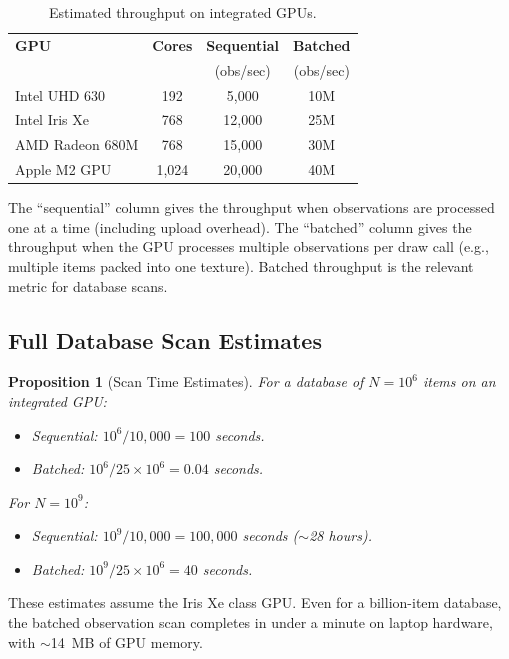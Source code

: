 \documentclass[11pt,twocolumn,a4paper]{article}
\newtheorem{proposition}[theorem]{Proposition}
\theoremstyle{definition}
\theoremstyle{remark}
\begin{document}
\begin{table}[H]
\centering
\caption{Estimated throughput on integrated GPUs.}
\label{tab:throughput}
\begin{tabular}{@{}lccc@{}}
\toprule
\textbf{GPU} & \textbf{Cores} & \textbf{Sequential} & \textbf{Batched} \\
 & & (obs/sec) & (obs/sec) \\
\midrule
Intel UHD 630 & 192 & 5{,}000 & 10M \\
Intel Iris Xe & 768 & 12{,}000 & 25M \\
AMD Radeon 680M & 768 & 15{,}000 & 30M \\
Apple M2 GPU & 1{,}024 & 20{,}000 & 40M \\
\bottomrule
\end{tabular}
\end{table}

The ``sequential'' column gives the throughput when observations are processed one at a time (including upload overhead). The ``batched'' column gives the throughput when the GPU processes multiple observations per draw call (e.g., multiple items packed into one texture). Batched throughput is the relevant metric for database scans.

\subsection{Full Database Scan Estimates}

\begin{proposition}[Scan Time Estimates]
\label{prop:scan_time}
For a database of $N = 10^6$ items on an integrated GPU:
\begin{itemize}[nosep]
\item Sequential: $10^6 / 10{,}000 = 100$ seconds.
\item Batched: $10^6 / 25 \times 10^6 = 0.04$ seconds.
\end{itemize}
For $N = 10^9$:
\begin{itemize}[nosep]
\item Sequential: $10^9 / 10{,}000 = 100{,}000$ seconds ($\sim$28 hours).
\item Batched: $10^9 / 25 \times 10^6 = 40$ seconds.
\end{itemize}
\end{proposition}

These estimates assume the Iris Xe class GPU. Even for a billion-item database, the batched observation scan completes in under a minute on laptop hardware, with $\sim$14~MB of GPU memory.
\end{document}
